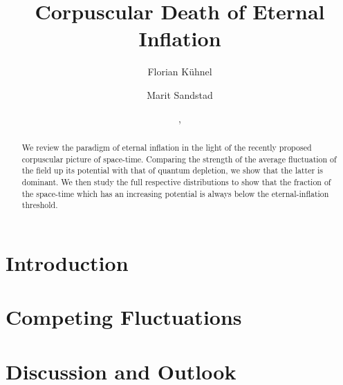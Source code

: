 \documentclass[aps, prd, preprint, superscriptaddress, tightenlines, nofootinbib]{revtex4}
\begin{document}
\title{\bf Corpuscular Death of Eternal Inflation}

\author{Florian K{\"u}hnel}

\author{Marit Sandstad}

\date{\formatdate{\day}{\month}{\year}, \currenttime}

\begin{abstract}
We review the paradigm of eternal inflation in the light of the recently proposed corpuscular picture of space-time. Comparing the strength of the average fluctuation of the field up its potential with that of quantum depletion, we show that the latter is dominant. We then study the full respective distributions to show that the fraction of the space-time which has an increasing potential is always below the eternal-inflation threshold.
\end{abstract}

\maketitle


\section{Introduction}
\label{sec:Introduction}
\setcounter{equation}{0}

\noindent




\section{Competing Fluctuations}
\label{sec:Main-Part}
\setcounter{equation}{0}

\noindent




\section{Discussion and Outlook}
\label{sec:Discussion-and-Outlook}
\setcounter{equation}{0}
\end{document}
